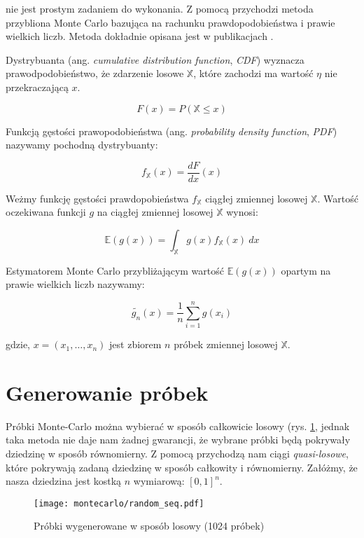 \documentclass[../main.tex]{subfiles}
\begin{document}
\noindent nie jest prostym zadaniem do wykonania. Z pomocą przychodzi metoda
przybliona Monte Carlo bazująca na rachunku prawdopodobieństwa i prawie
wielkich liczb. Metoda dokładnie opisana jest w publikacjach
\cite{MonteCarloAnderson}\cite{Veach}.

\vspace{1cm}
\vspace{1cm}

Dystrybuanta (ang. \textit{cumulative distribution function}, \textit{CDF})
wyznacza prawodpodobieństwo, że zdarzenie losowe $\mathbb{X}$, które zachodzi
ma wartość $\eta$ nie przekraczającą $x$.

$$
F(x) = P(\mathbb{X} \leq x)
$$

Funkcją gęstości prawopodobieństwa (ang. \textit{probability density
function}, \textit{PDF}) nazywamy pochodną dystrybuanty:

$$
f_{\mathbb{X}}(x) = \frac{dF}{dx}(x)
$$

Weżmy funkcję gęstości prawdopobieństwa $f_{\mathbb{X}}$ ciągłej zmiennej
losowej $\mathbb{X}$. Wartość oczekiwana funkcji $g$ na ciągłej zmiennej
losowej $\mathbb{X}$ wynosi:

$$
\mathbb{E}(g(x)) =
\int_{\mathbb{X}}{
  g(x) f_{\mathbb{X}}(x)
  \: dx
}
$$

Estymatorem Monte Carlo przybliżającym wartość $\mathbb{E}(g(x))$ opartym na
prawie wielkich liczb nazywamy:

\[
\widetilde{g_n}(x) =
  \frac{1}{n}
  \sum_{i=1}^{n}g(x_i)
\]

\noindent gdzie, $x=(x_1, \ldots, x_n)$ jest zbiorem $n$ próbek zmiennej
losowej $\mathbb{X}$.

\section{Generowanie próbek}

Próbki Monte-Carlo można wybierać w sposób całkowicie losowy (rys.
\ref{fig:RandomSamples}, jednak taka metoda nie daje nam żadnej gwarancji, że
wybrane próbki będą pokrywały dziedzinę w sposób równomierny. Z pomocą
przychodzą nam ciągi \textit{quasi-losowe}, które pokrywają zadaną dziedzinę w
sposób całkowity i równomierny. Załóżmy, że nasza dziedzina jest kostką $n$
wymiarową: $[0,1]^{n}$.

\begin{figure}[h]
  \centering
  \texttt{[image: montecarlo/random\_seq.pdf]}
  \caption{Próbki wygenerowane w sposób losowy (1024 próbek)}
  \label{fig:RandomSamples}
\end{figure}
\end{document}
